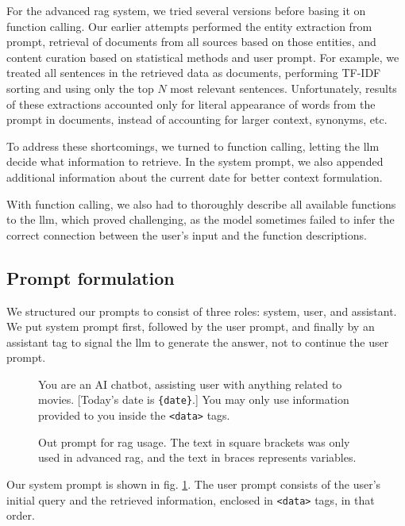 \documentclass[fleqn,moreauthors,10pt]{ds_report}
\begin{document}
For the advanced \ac{rag} system, we tried several versions before basing it on function calling. Our earlier attempts performed the entity extraction from prompt, retrieval of documents from all sources based on those entities, and content curation based on statistical methods and user prompt. For example, we treated all sentences in the retrieved data as documents, performing TF-IDF sorting and using only the top $N$ most relevant sentences. Unfortunately, results of these extractions accounted only for literal appearance of words from the prompt in documents, instead of accounting for larger context, synonyms, etc.

To address these shortcomings, we turned to function calling, letting the \ac{llm} decide what information to retrieve. In the system prompt, we also appended additional information about the current date for better context formulation.

With function calling, we also had to thoroughly describe all available functions to the \ac{llm}, which proved challenging, as the model sometimes failed to infer the correct connection between the user's input and the function descriptions.

\subsection*{Prompt formulation}

We structured our prompts to consist of three roles: system, user, and assistant. We put system prompt first, followed by the user prompt, and finally by an assistant tag to signal the \ac{llm} to generate the answer, not to continue the user prompt.



\begin{figure}[h!]
    \begin{tcolorbox}
        You are an AI chatbot, assisting user with anything related to movies. [Today's date is \verb|{date}|.] You may only use information provided to you inside the \verb|<data>| tags.
    \end{tcolorbox}
    \caption{Out prompt for \ac{rag} usage. The text in square brackets was only used in advanced \ac{rag}, and the text in braces represents variables.}
    \label{fig:prompt}
\end{figure}

Our system prompt is shown in fig. \ref{fig:prompt}. The user prompt consists of the user's initial query and the retrieved information, enclosed in \verb|<data>| tags, in that order.
\end{document}
